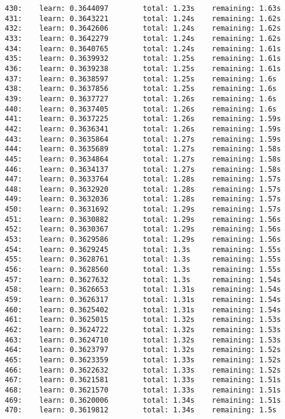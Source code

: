 \documentclass[11pt]{article}
\begin{document}
\begin{Verbatim}[commandchars=\\\{\}]
430:    learn: 0.3644097        total: 1.23s    remaining: 1.63s
431:    learn: 0.3643221        total: 1.24s    remaining: 1.62s
432:    learn: 0.3642606        total: 1.24s    remaining: 1.62s
433:    learn: 0.3642279        total: 1.24s    remaining: 1.62s
434:    learn: 0.3640765        total: 1.24s    remaining: 1.61s
435:    learn: 0.3639932        total: 1.25s    remaining: 1.61s
436:    learn: 0.3639238        total: 1.25s    remaining: 1.61s
437:    learn: 0.3638597        total: 1.25s    remaining: 1.6s
438:    learn: 0.3637856        total: 1.25s    remaining: 1.6s
439:    learn: 0.3637727        total: 1.26s    remaining: 1.6s
440:    learn: 0.3637405        total: 1.26s    remaining: 1.6s
441:    learn: 0.3637225        total: 1.26s    remaining: 1.59s
442:    learn: 0.3636341        total: 1.26s    remaining: 1.59s
443:    learn: 0.3635864        total: 1.27s    remaining: 1.59s
444:    learn: 0.3635689        total: 1.27s    remaining: 1.58s
445:    learn: 0.3634864        total: 1.27s    remaining: 1.58s
446:    learn: 0.3634137        total: 1.27s    remaining: 1.58s
447:    learn: 0.3633764        total: 1.28s    remaining: 1.57s
448:    learn: 0.3632920        total: 1.28s    remaining: 1.57s
449:    learn: 0.3632036        total: 1.28s    remaining: 1.57s
450:    learn: 0.3631692        total: 1.29s    remaining: 1.57s
451:    learn: 0.3630882        total: 1.29s    remaining: 1.56s
452:    learn: 0.3630367        total: 1.29s    remaining: 1.56s
453:    learn: 0.3629586        total: 1.29s    remaining: 1.56s
454:    learn: 0.3629245        total: 1.3s     remaining: 1.55s
455:    learn: 0.3628761        total: 1.3s     remaining: 1.55s
456:    learn: 0.3628560        total: 1.3s     remaining: 1.55s
457:    learn: 0.3627632        total: 1.3s     remaining: 1.54s
458:    learn: 0.3626653        total: 1.31s    remaining: 1.54s
459:    learn: 0.3626317        total: 1.31s    remaining: 1.54s
460:    learn: 0.3625402        total: 1.31s    remaining: 1.54s
461:    learn: 0.3625015        total: 1.32s    remaining: 1.53s
462:    learn: 0.3624722        total: 1.32s    remaining: 1.53s
463:    learn: 0.3624710        total: 1.32s    remaining: 1.53s
464:    learn: 0.3623797        total: 1.32s    remaining: 1.52s
465:    learn: 0.3623359        total: 1.33s    remaining: 1.52s
466:    learn: 0.3622632        total: 1.33s    remaining: 1.52s
467:    learn: 0.3621581        total: 1.33s    remaining: 1.51s
468:    learn: 0.3621570        total: 1.33s    remaining: 1.51s
469:    learn: 0.3620006        total: 1.34s    remaining: 1.51s
470:    learn: 0.3619812        total: 1.34s    remaining: 1.5s

\end{Verbatim}
\end{document}
